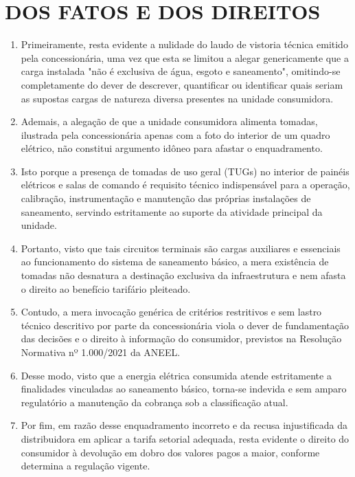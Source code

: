 \newcommand{\tipoRequerimento}{cobrança indevida sobre enquadramento tarifário incorreto}
\section{DOS FATOS E DOS DIREITOS}

\begin{enumerate}[resume]
    \item Primeiramente, resta evidente a nulidade do laudo de vistoria técnica emitido pela concessionária, uma vez que esta se limitou a alegar genericamente que a carga instalada "não é exclusiva de água, esgoto e saneamento", omitindo-se completamente do dever de descrever, quantificar ou identificar quais seriam as supostas cargas de natureza diversa presentes na unidade consumidora.
    
    \item Ademais, a alegação de que a unidade consumidora alimenta tomadas, ilustrada pela concessionária apenas com a foto do interior de um quadro elétrico, não constitui argumento idôneo para afastar o enquadramento.
    
    \item Isto porque a presença de tomadas de uso geral (TUGs) no interior de painéis elétricos e salas de comando é requisito técnico indispensável para a operação, calibração, instrumentação e manutenção das próprias instalações de saneamento, servindo estritamente ao suporte da atividade principal da unidade.
    
    \item Portanto, visto que tais circuitos terminais são cargas auxiliares e essenciais ao funcionamento do sistema de saneamento básico, a mera existência de tomadas não desnatura a destinação exclusiva da infraestrutura e nem afasta o direito ao benefício tarifário pleiteado.
    
    \item Contudo, a mera invocação genérica de critérios restritivos e sem lastro técnico descritivo por parte da concessionária viola o dever de fundamentação das decisões e o direito à informação do consumidor, previstos na Resolução Normativa nº 1.000/2021 da ANEEL.
    
    \item Desse modo, visto que a energia elétrica consumida atende estritamente a finalidades vinculadas ao saneamento básico, torna-se indevida e sem amparo regulatório a manutenção da cobrança sob a classificação atual.
    
    \item Por fim, em razão desse enquadramento incorreto e da recusa injustificada da distribuidora em aplicar a tarifa setorial adequada, resta evidente o direito do consumidor à devolução em dobro dos valores pagos a maior, conforme determina a regulação vigente.
\end{enumerate}


